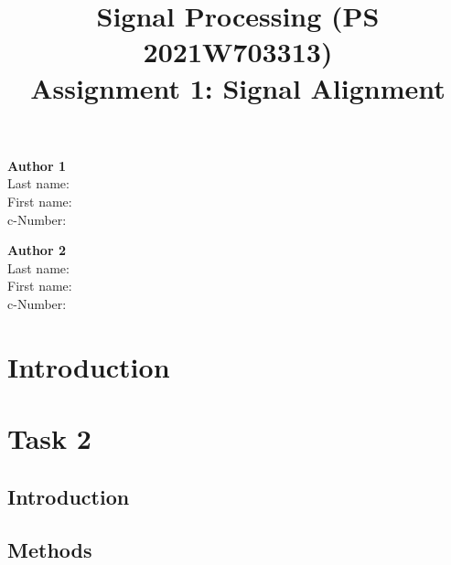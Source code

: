 \documentclass[11pt,a4paper]{article}
\title{\textbf{Signal Processing (PS 2021W703313) \\Assignment 1: Signal Alignment}}
\date{}
\begin{document}
\maketitle
\vspace{-3em}

\begin{tcolorbox}[
size=tight,
colback=white,
boxrule=0.2mm,
left=3mm,right=3mm, top=3mm, bottom=1mm
]
{\begin{multicols}{2}

\textbf{Author 1}       \\
Last name:              \\  %
First name:        \\  %
c-Number:               \\  %

\columnbreak

\textbf{Author 2}       \\
Last name:               \\  %
First name:              \\  %
c-Number:                \\  %

\end{multicols}}
\end{tcolorbox}

\section{Introduction}

\section{Task 2}
\subsection{Introduction}
\label{sec:intro}

\subsection{Methods}
\end{document}
